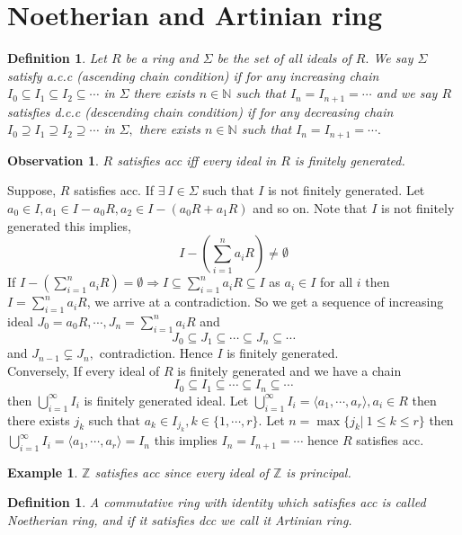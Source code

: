 \documentclass[11pt]{amsart}
\newtheorem{definition}[theorem]{Definition}%
\newtheorem{eg}[theorem]{Example}
\newtheorem{obs}[theorem]{Observation}
\newcommand{\ZZ}{\mathbb Z}
\newcommand{\NN}{\mathbb N}
\begin{document}
\newpage
\section{Noetherian and Artinian ring}
\begin{definition}
Let $R$ be a ring and $\Sigma$ be the set of all ideals of $R.$ We say $\Sigma$ satisfy a.c.c (ascending chain condition) if for any increasing chain $I_0\subseteq I_1\subseteq I_2\subseteq \cdots$ in $\Sigma$ there exists $n\in {\NN}$ such that $I_n=I_{n+1}=\cdots$ and we say $R$ satisfies d.c.c (descending chain condition) if for any decreasing chain $I_0\supseteq I_1\supseteq I_2\supseteq \cdots$ in $\Sigma,$ there exists $n\in {\NN}$ such that $I_n=I_{n+1}=\cdots.$ 
\end{definition}
\begin{obs}
$R$ satisfies acc iff every ideal in $R$ is finitely generated.
\end{obs}
\proof Suppose, $R$ satisfies acc. If $\exists~I\in \Sigma$ such that $I$ is not finitely generated. Let $a_0\in I,a_1\in I- a_0R,a_2\in I-(a_0R+a_1R)$ and so on. Note that $I$ is not finitely generated this implies, $$I-\left(\displaystyle\sum_{i=1}^n a_iR\right)\neq \emptyset$$ If $I-\left(\displaystyle\sum_{i=1}^n a_iR\right)=\emptyset \Rightarrow I\subseteq \displaystyle\sum_{i=1}^n a_iR\subseteq I$ as $a_i\in I$ for all $i$ then $I=\displaystyle\sum_{i=1}^n a_iR$, we arrive at a contradiction. So we get a sequence of increasing ideal $J_0=a_0R,\cdots ,J_n=\displaystyle\sum_{i=1}^n a_iR$ and $$J_0\subseteq J_1\subseteq \cdots \subseteq J_n\subseteq \cdots $$ and $J_{n-1}\subsetneq J_n,$ contradiction. Hence $I$ is finitely generated.\\
Conversely, If every ideal of $R$ is finitely generated and we have a chain $$I_0\subseteq I_1\subseteq \cdots \subseteq I_n\subseteq \cdots $$ then $\displaystyle\bigcup_{i=1}^{\infty} I_i$ is finitely generated ideal. Let $\displaystyle\bigcup_{i=1}^{\infty} I_i=\langle a_1,\cdots ,a_r\rangle,a_i\in R$ then there exists $j_k$ such that $a_k\in I_{j_k},k\in \{1,\cdots ,r\}.$ Let $n=\max \{j_k|~1\leq k\leq r\}$ then $\displaystyle\bigcup_{i=1}^{\infty} I_i=\langle a_1,\cdots ,a_r\rangle=I_n$ this implies $I_n=I_{n+1}=\cdots $ hence $R$ satisfies acc.
\begin{eg}
${\ZZ}$ satisfies acc since every ideal of ${\ZZ}$ is principal.
\end{eg}
\begin{definition}
A commutative ring with identity which satisfies acc is called Noetherian ring, and if it satisfies dcc we call it Artinian ring.
\end{definition}
\end{document}
